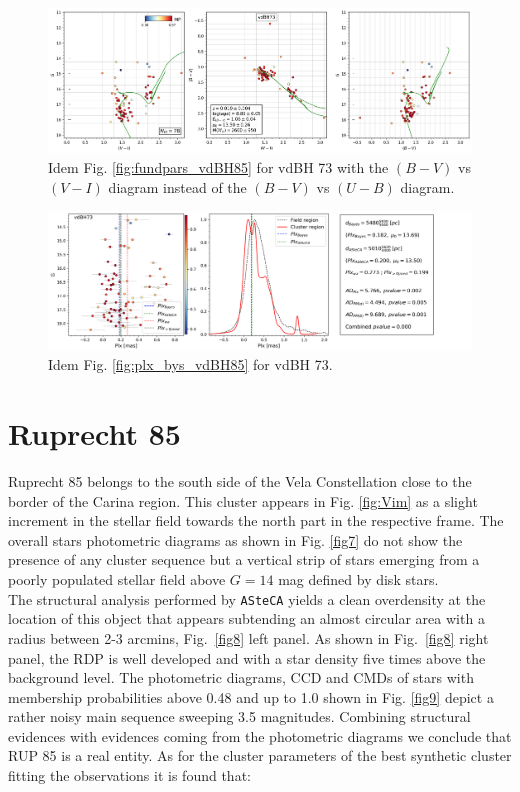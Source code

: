 \documentclass[draft]{aa}
\begin{document}
\begin{figure}[ht]
    \centering
    \includegraphics[width=\hsize]{../figs/cmds_vdBH73.png}
\caption{Idem Fig. \ref{fig:fundpars_vdBH85} for vdBH 73 with the $(B-V)$ vs
$(V-I)$ diagram instead of the $(B-V)$ vs $(U-B)$ diagram.}
    \label{fig:fundpars_vdBH73}
\end{figure}

\begin{figure}[ht]
    \centering
    \includegraphics[width=\hsize]{../figs/plx_vdBH73.png}
\caption{Idem Fig. \ref{fig:plx_bys_vdBH85} for vdBH 73.}
\label{fig:plx_bys_vdBH73}
\end{figure}




\section{Ruprecht 85}

Ruprecht 85 belongs to the south side of the Vela Constellation close to the
border of the Carina region. This cluster appears in Fig. \ref{fig:Vim} as a
slight increment in the stellar field towards the north part in the respective
frame.
The overall stars photometric diagrams as shown in Fig. \ref{fig7} do not show
the presence of any cluster sequence but a vertical strip of stars emerging from
a poorly populated stellar field above $G=14$ mag defined by disk stars.\\

The structural analysis performed by \texttt{ASteCA} yields a clean overdensity
at the location of this object that appears subtending an almost circular area
with a radius between 2-3 arcmins, Fig.~\ref{fig8} left panel.
As shown in Fig.~\ref{fig8} right panel, the RDP is well developed
and with a star density five times above the background level. The
photometric diagrams, CCD and CMDs of stars with membership probabilities above
0.48 and up to 1.0 shown in Fig. \ref{fig9} depict a rather noisy main
sequence sweeping 3.5 magnitudes.
Combining structural evidences with evidences coming from the photometric
diagrams we conclude that RUP 85 is a real entity. As for the cluster
parameters of the best synthetic cluster fitting the observations it is found
that:
\end{document}

